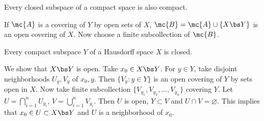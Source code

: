  Every closed subspace of a compact space is also compact.

\pf If \(\mc{A}\) is a covering of \(Y\) by open sets of \(X\), \(\mc{B} = \mc{A} \cup \{X \bs Y\}\) is an open covering of \(X\). Now choose a finite subcollection of \(\mc{B}\).

 Every compact subspace \(Y\) of a Hausdorff space \(X\) is closed.

\pf We show that \(X \bs Y\) is open. Take \(x_0 \in X \bs Y\). For \(y \in Y\), take disjoint neighborhoods \(U_y, V_y\) of \(x_0, y\). Then \(\{V_y : y \in Y\}\) is an open covering of \(Y\) by sets open in \(X\). Now take finite subcollection \(\{V_{y_1}, V_{y_2}, \dots, V_{y_n}\}\) covering \(Y\). Let \(U = \bigcap_{i=1}^n U_{y_i}\), \(V = \bigcup_{i=1}^n V_{y_i}\). Then \(U\) is open, \(Y \subset V\) and \(U \cap V = \varnothing\). This implies that \(x_0 \in U \subset X \bs Y\) and \(U\) is a neighborhood of \(x_0\).

\pagebreak
